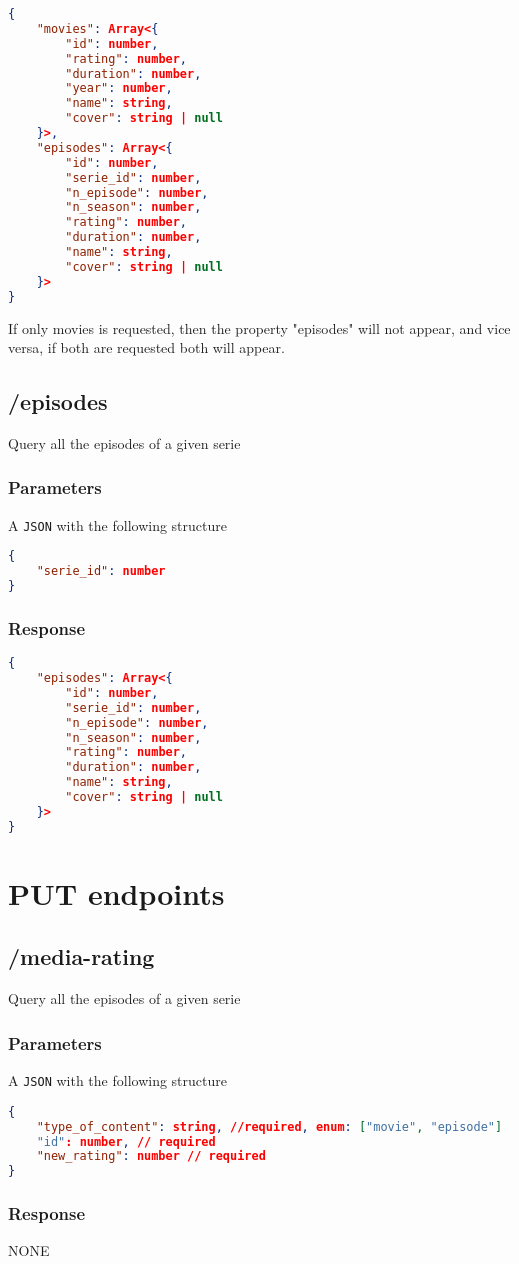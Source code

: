 \documentclass{article}
\newcommand{\mono}{\texttt}
\begin{document}
\begin{lstlisting}[language=json]
{
	"movies": Array<{
		"id": number,
		"rating": number,
		"duration": number,
		"year": number,
		"name": string,
		"cover": string | null
	}>,
	"episodes": Array<{
		"id": number,
		"serie_id": number,
		"n_episode": number,
		"n_season": number,
		"rating": number,
		"duration": number,
		"name": string,
		"cover": string | null
	}>
}
\end{lstlisting}

If only movies is requested, then the property "episodes" will not appear, and vice versa, if both are requested both will appear.

\subsection{/episodes}

Query all the episodes of a given serie

\subsubsection{Parameters}
A \mono{JSON} with the following structure

\begin{lstlisting}[language=json]
{
	"serie_id": number
}
\end{lstlisting}

\subsubsection{Response}

\begin{lstlisting}[language=json]
{
	"episodes": Array<{
		"id": number,
		"serie_id": number,
		"n_episode": number,
		"n_season": number,
		"rating": number,
		"duration": number,
		"name": string,
		"cover": string | null
	}>
}
\end{lstlisting}

\section{PUT endpoints}

\subsection{/media-rating}

Query all the episodes of a given serie

\subsubsection{Parameters}
A \mono{JSON} with the following structure

\begin{lstlisting}[language=json]
{
	"type_of_content": string, //required, enum: ["movie", "episode"]
	"id": number, // required
	"new_rating": number // required
}
\end{lstlisting}

\subsubsection{Response}
NONE
\end{document}
